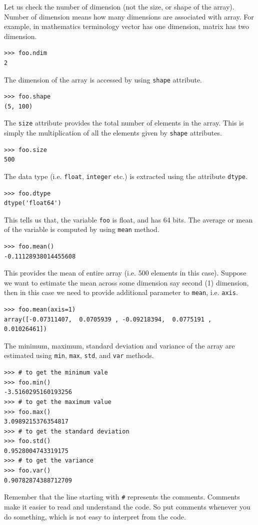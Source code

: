 \documentclass[10pt]{book}
\begin{document}
{Let us check the number of dimension (not the size, or shape of the array). Number of dimension means how many dimensions are associated with array. For example, in mathematics terminology vector has one dimension, matrix has two dimension. 
\beforeverb \begin{verbatim}
>>> foo.ndim			
2
\end{verbatim} \afterverb
The dimension of the array is accessed by using \verb"shape" attribute.
\beforeverb \begin{verbatim}
>>> foo.shape
(5, 100)
\end{verbatim} \afterverb
The \verb"size" attribute provides the total number of elements in the array. This is simply the multiplication of all the elements given by \verb"shape" attributes. 
\beforeverb \begin{verbatim}
>>> foo.size
500
\end{verbatim} \afterverb
The data type (i.e. \verb"float", \verb"integer" etc.) is extracted using the attribute \verb"dtype".
\beforeverb \begin{verbatim}
>>> foo.dtype
dtype('float64')
\end{verbatim} \afterverb
This tells us that, the variable \verb"foo" is float, and has 64 bits. The average or mean of the variable is computed by using \verb"mean" method.
\beforeverb \begin{verbatim}
>>> foo.mean()
-0.11128938014455608
\end{verbatim} \afterverb
This provides the mean of entire array (i.e. 500 elements in this case). Suppose we want to estimate the mean across some dimension say second (1) dimension, then in this case we need to provide additional parameter to \verb"mean", i.e. \verb"axis".
\beforeverb \begin{verbatim}
>>> foo.mean(axis=1)
array([-0.07311407,  0.0705939 , -0.09218394,  0.0775191 ,  0.01026461])
\end{verbatim} \afterverb
The minimum, maximum, standard deviation and variance of the array are estimated using \verb"min", \verb"max", \verb"std", and \verb"var" methods.
\beforeverb \begin{verbatim}
>>> # to get the minimum vale
>>> foo.min()
-3.5160295160193256
>>> # to get the maximum value 
>>> foo.max()
3.0989215376354817
>>> # to get the standard deviation
>>> foo.std()
0.9528004743319175
>>> # to get the variance
>>> foo.var()
0.90782874388712709
\end{verbatim} \afterverb
Remember that the line starting with \verb"#" represents the comments. Comments make it easier to read and understand the code. So put comments whenever you do something, which is not easy to interpret from the code. \\

}
\end{document}
